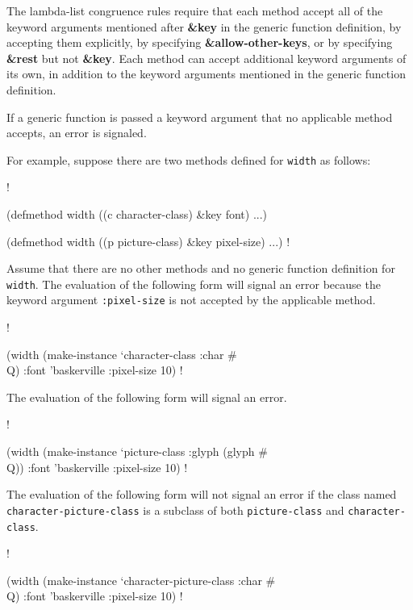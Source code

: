 The lambda-list congruence rules require that each method
accept all of the keyword arguments mentioned after {\bf \&key} in the
generic function definition, by accepting them explicitly, by
specifying {\bf \&allow-other-keys}, or by specifying {\bf \&rest} but
not {\bf \&key}.  Each method can accept additional keyword arguments
of its own, in addition to the keyword arguments mentioned in the
generic function definition.

If a generic function is passed a keyword argument that no applicable
method accepts, an error is signaled.

For example, suppose there are two methods defined for {\tt width}
as follows:

\screen!

(defmethod width ((c character-class) &key font) ...)

(defmethod width ((p picture-class) &key pixel-size) ...)
\endscreen!

\noindent Assume that there are no other methods and no generic
function definition for {\tt width}. The evaluation of the
following form will signal an error because the keyword argument
{\tt :pixel-size} is not accepted by the applicable method.

\screen!

(width (make-instance `character-class :char \#\\Q) 
       :font 'baskerville :pixel-size 10)
\endscreen!

The evaluation of the following form will signal an error.

\screen!

(width (make-instance `picture-class :glyph (glyph \#\\Q)) 
       :font 'baskerville :pixel-size 10)
\endscreen!

The evaluation of the following form will not signal an error
if the class named {\tt character-picture-class} is a subclass of
both {\tt picture-class} and {\tt character-class}.

\screen!

(width (make-instance `character-picture-class :char \#\\Q)
       :font 'baskerville :pixel-size 10)
\endscreen!

\endsubSection%

\endSection%


